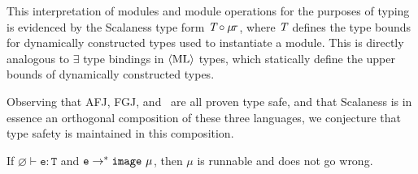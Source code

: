 This interpretation of modules and module operations for the purposes of typing is evidenced by
the Scalaness type form $\textit{T} \circ \mu\!\tau$, where $\textit{T}$ defines the type bounds
for dynamically constructed types used to instantiate a module. This is directly analogous to
$\exists$ type bindings in $\langle \text{ML} \rangle$ types, which statically define the upper bounds of dynamically
constructed types.

Observing that AFJ, FGJ, and \fml\ are all proven type safe, and that Scalaness is in essence an
orthogonal composition of these three languages, we conjecture that type safety is maintained in
this composition.

\begin{conject}
  If $\varnothing \vdash \texttt{e} : \texttt{T}$ and $\texttt{e} \rightarrow^* \mathtt{image}\ \mu$,
  then $\mu$ is runnable and does not go wrong.
\end{conject}

